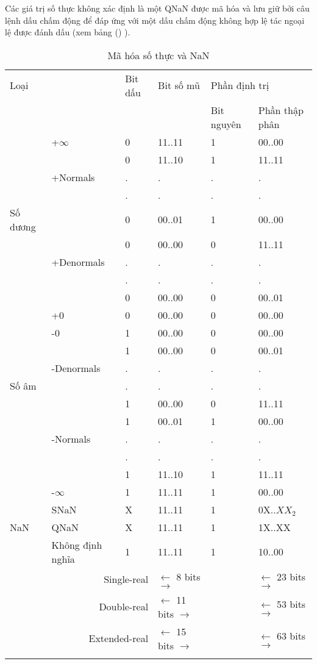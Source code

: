 	Các giá trị số thực không xác định là một QNaN được mã hóa và lưu giữ bởi câu lệnh dấu chấm động để đáp ứng với một dấu chấm động không hợp lệ tác ngoại lệ được đánh dấu (xem bảng () ).	
	\newpage
		\begin{longtable}{|l|l|l|l|l|l|}
			\hline
				\multicolumn{2}{|l|}{Loại} & Bit dấu & Bit số mũ & \multicolumn{2}{l|}{Phần định trị} \\
				\cline{5-6}
				\multicolumn{2}{|l|}{} & & & Bit nguyên & Phần thập phân \\
			\hline
				 & +$\mathbb{\infty}$ & 0 & 11..11 & 1 & 00..00 \\
				\cline{2-6}
				  & & 0 & 11..10 & 1 & 11..11 \\
				  & +Normals & . & .& . & . \\
				  & & . & . & . & . \\
				 Số dương & & 0 & 00..01 & 1 & 00..00 \\
				 	\cline{2-6}
				  & & 0 & 00..00 & 0 & 11..11 \\
				  & +Denormals& . & .& . & . \\
				  & & . & . & . & . \\
				  & & 0 & 00..00 & 0 & 00..01 \\
				  \cline{2-6}
				  & +0 & 0& 00..00 & 0 & 00..00 \\
			\hline			
				  & -0 & 1 & 00..00 & 0 & 00..00 \\
				\cline{2-6}
				  & & 1 & 00..00 & 0 & 00..01 \\
				  & -Denormals& . & .& . & . \\
				 Số âm & & . & . & . & . \\
				  & & 1 & 00..00 & 0 & 11..11 \\
				\cline{2-6}
				  & & 1 & 00..01 & 1 & 00..00 \\
				  & -Normals & . & .& . & . \\
				  & & . & . & . & . \\
				  & & 1 & 11..10 & 1 & 11..11 \\
				 \cline{2-6}
				  & -$\mathbb{\infty}$ & 1 & 11..11 & 1 & 00..00 \\
			\hline			
				  & SNaN & X & 11..11 & 1&  0X..$XX_2$ \\
				\cline{2-6}
				 NaN & QNaN & X & 11..11 & 1& 1X..XX\\
				\cline{2-6}
				  & Không định nghĩa &1 & 11..11& 1  &10..00 \\
			\hline
				\multicolumn{3}{r|}{Single-real} & $\leftarrow$ 8 bits $\to $ & & $\leftarrow$ 23 bits $\to $ \\
				\multicolumn{3}{r|}{Double-real} & $\leftarrow$ 11 bits $\to $ & & $\leftarrow$ 53 bits $\to $ \\
				\multicolumn{3}{r|}{Extended-real} & $\leftarrow$ 15 bits $\to $ & & $\leftarrow$ 63 bits $\to $ \\
				\caption{Mã hóa số thực và NaN}
				\label{tb:MaHoaSoThuc}
		\end{longtable}	
	

